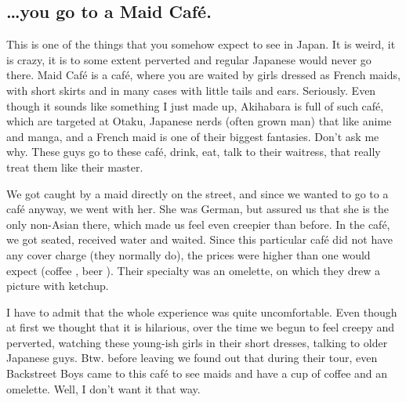 \begin{post}
\begin{content}
\subsection{{\ldots}you go to a Maid Café.}
This is one of the things that you somehow expect to see in Japan. It is weird, it is crazy, it is to some extent perverted and regular Japanese would never go there. Maid Café is a café, where you are waited by girls dressed as French maids, with short skirts and in many cases with little tails and ears. Seriously. Even though it sounds like something I just made up, Akihabara is full of such café, which are targeted at Otaku, Japanese nerds (often grown man) that like anime and manga, and a French maid is one of their biggest fantasies. Don't ask me why. These guys go to these café, drink, eat, talk to their waitress, that really treat them like their master.


We got caught by a maid directly on the street, and since we wanted to go to a café anyway, we went with her. She was German, but assured us that she is the only non-Asian there, which made us feel even creepier than before. In the café, we got seated, received water and waited. Since this particular café did not have any cover charge (they normally do), the prices were higher than one would expect (coffee , beer ). Their specialty was an omelette, on which they drew a picture with ketchup.

\begin{figure}
\vspace{-24pt}
\end{figure}

I have to admit that the whole experience was quite uncomfortable. Even though at first we thought that it is hilarious, over the time we begun to feel creepy and perverted, watching these young-ish girls in their short dresses, talking to older Japanese guys. Btw. before leaving we found out that during their tour, even Backstreet Boys came to this café to see maids and have a cup of coffee and an omelette. Well, I don't want it that way.


\end{content}
\end{post}
